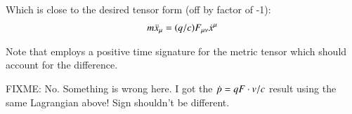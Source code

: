 \documentclass{article}
\begin{document}
Which is close to the desired tensor form (off by factor of -1):
\begin{align*}
m \ddot{x}_\mu &= (q/c) F_{\mu\nu} \dot{x}^\mu \\
\end{align*}

Note that \cite{doran2003gap} employs a positive time signature for the metric tensor which
should account for the difference.

FIXME: No.  Something is wrong here.  I got the $\dot{p} = q F\cdot v/c$ result
using the same Lagrangian above!  Sign shouldn't be different.

\end{document}
